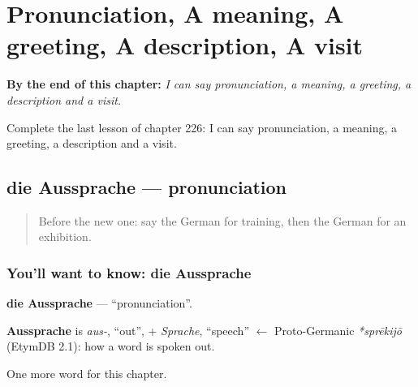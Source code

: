 
\chapter{Pronunciation, A meaning, A greeting, A description, A visit}
\label{ch:ge-pronunciation-a-meaning-a-greeting-a-description-a-visit}

\begin{chapteropening}
\textbf{By the end of this chapter:} \emph{I can say pronunciation, a meaning, a greeting, a description and a visit.}

Complete the last lesson of chapter 226: I can say pronunciation, a meaning, a greeting, a description and a visit.
\end{chapteropening}

\section[die Aussprache]{die Aussprache — pronunciation}

\label{lesson:GE-C226-aussprache}



\begin{quote}
Before the new one: say the German for training, then the German for an exhibition.
\end{quote}

\subsection*{You'll want to know: die Aussprache}
\textbf{die Aussprache} — \textquotedblleft{}pronunciation\textquotedblright{}.

\begin{cousinweb}
\textbf{Aussprache} is \emph{aus-}, \textquotedblleft{}out\textquotedblright{}, + \emph{Sprache}, \textquotedblleft{}speech\textquotedblright{} $\leftarrow$ Proto-Germanic \emph{*sprēkijō} (EtymDB 2.1): how a word is spoken out.
\end{cousinweb}

\begin{grammarlens}[title={What you've built}]
One more word for this chapter.
\end{grammarlens}

